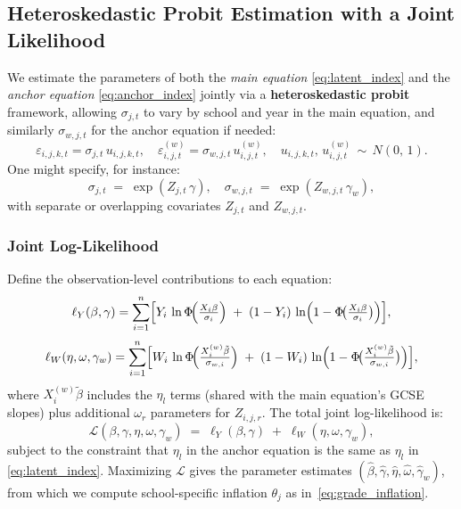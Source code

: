\subsection{Heteroskedastic Probit Estimation with a Joint Likelihood}

We estimate the parameters of both the \emph{main equation} \eqref{eq:latent_index} and the \emph{anchor equation} \eqref{eq:anchor_index} jointly via a \textbf{heteroskedastic probit} framework, allowing $\sigma_{j,t}$ to vary by school and year in the main equation, and similarly $\sigma_{w,j,t}$ for the anchor equation if needed:
\[
    \varepsilon_{i,j,k,t} = \sigma_{j,t}\,u_{i,j,k,t},\quad
    \varepsilon_{i,j,t}^{(w)} = \sigma_{w,j,t}\,u_{i,j,t}^{(w)},
    \quad
    u_{i,j,k,t},\,u_{i,j,t}^{(w)} \,\sim\, N(0,\,1).
\]
One might specify, for instance:
\[
    \sigma_{j,t} \;=\;\exp(Z_{j,t}\,\gamma),
    \quad
    \sigma_{w,j,t} \;=\;\exp(Z_{w,j,t}\,\gamma_w),
\]
with separate or overlapping covariates $Z_{j,t}$ and $Z_{w,j,t}$. 

\subsubsection*{Joint Log-Likelihood}
Define the observation-level contributions to each equation:
\[
\ell_Y(\beta,\gamma)
=
\sum_{i=1}^n
\Bigl[
Y_{i}\,\ln \Phi\!\Bigl(\tfrac{X_i\beta}{\sigma_i}\Bigr)
\;+\;
(1 - Y_{i}) \,\ln \Bigl(1 - \Phi\!\bigl(\tfrac{X_i\beta}{\sigma_i}\bigr)\Bigr)
\Bigr],
\]
\[
\ell_W(\eta,\omega,\gamma_w)
=
\sum_{i=1}^n
\Bigl[
W_{i}\,\ln \Phi\!\Bigl(\tfrac{X_i^{(w)}\tilde{\beta}}{\sigma_{w,i}}\Bigr)
\;+\;
(1 - W_{i}) \,\ln \Bigl(1 - \Phi\!\bigl(\tfrac{X_i^{(w)}\tilde{\beta}}{\sigma_{w,i}}\bigr)\Bigr)
\Bigr],
\]
where $X_i^{(w)}\tilde{\beta}$ includes the \(\eta_l\) terms (shared with the main equation’s GCSE slopes) plus additional $\omega_r$ parameters for $Z_{i,j,r}$. The total joint log-likelihood is:
\[
\mathcal{L}(\beta,\gamma,\eta,\omega,\gamma_w)
\;=\;
\ell_Y(\beta,\gamma)
\;+\;
\ell_W(\eta,\omega,\gamma_w),
\]
subject to the constraint that \(\eta_l\) in the anchor equation is the same as \(\eta_l\) in \eqref{eq:latent_index}. Maximizing $\mathcal{L}$ gives the parameter estimates $(\hat{\beta},\hat{\gamma},\hat{\eta},\hat{\omega},\hat{\gamma}_w)$, from which we compute school-specific inflation $\theta_j$ as in~\eqref{eq:grade_inflation}.

